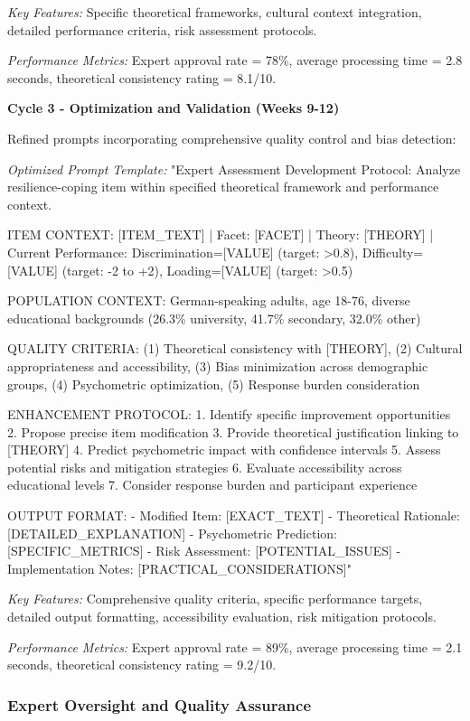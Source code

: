 \documentclass[12pt,a4paper]{article}
\begin{document}
\textit{Key Features:} Specific theoretical frameworks, cultural context integration, detailed performance criteria, risk assessment protocols.

\textit{Performance Metrics:} Expert approval rate = 78\%, average processing time = 2.8 seconds, theoretical consistency rating = 8.1/10.

\textbf{Cycle 3 - Optimization and Validation (Weeks 9-12)}

Refined prompts incorporating comprehensive quality control and bias detection:

\textit{Optimized Prompt Template:} "Expert Assessment Development Protocol: Analyze resilience-coping item within specified theoretical framework and performance context. 

ITEM CONTEXT: [ITEM_TEXT] | Facet: [FACET] | Theory: [THEORY] | Current Performance: Discrimination=[VALUE] (target: >0.8), Difficulty=[VALUE] (target: -2 to +2), Loading=[VALUE] (target: >0.5)

POPULATION CONTEXT: German-speaking adults, age 18-76, diverse educational backgrounds (26.3\% university, 41.7\% secondary, 32.0\% other)

QUALITY CRITERIA: (1) Theoretical consistency with [THEORY], (2) Cultural appropriateness and accessibility, (3) Bias minimization across demographic groups, (4) Psychometric optimization, (5) Response burden consideration

ENHANCEMENT PROTOCOL: 
1. Identify specific improvement opportunities
2. Propose precise item modification
3. Provide theoretical justification linking to [THEORY]
4. Predict psychometric impact with confidence intervals
5. Assess potential risks and mitigation strategies
6. Evaluate accessibility across educational levels
7. Consider response burden and participant experience

OUTPUT FORMAT: 
- Modified Item: [EXACT_TEXT]
- Theoretical Rationale: [DETAILED_EXPLANATION]
- Psychometric Prediction: [SPECIFIC_METRICS]
- Risk Assessment: [POTENTIAL_ISSUES]
- Implementation Notes: [PRACTICAL_CONSIDERATIONS]"

\textit{Key Features:} Comprehensive quality criteria, specific performance targets, detailed output formatting, accessibility evaluation, risk mitigation protocols.

\textit{Performance Metrics:} Expert approval rate = 89\%, average processing time = 2.1 seconds, theoretical consistency rating = 9.2/10.

\subsubsection{Expert Oversight and Quality Assurance}
\end{document}
